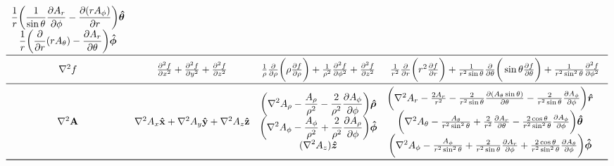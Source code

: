 \documentclass[a4paper]{scrarticle}
\begin{document}
\begin{sidewaystable}
\[\begin{array}{cccc}
\begin{matrix}
    \displaystyle \frac{1}{ r} \bigg (\frac{1 }{ \sin\theta}\pdv{A_r }{\phi}
    - \pdv{( r A_\phi )}{r}  \bigg ) \boldsymbol{\hat \theta}\\
    \displaystyle \frac{1 }{ r}\bigg (\frac{\partial }{ \partial r} ( r A_\theta )
    - \pdv{ A_r }{\theta} \bigg) \boldsymbol{\hat \phi}
\end{matrix}
\\
\midrule
\nabla^2 f &
    \frac{\partial^2 f }{ \partial x^2} + \frac{\partial^2 f }{ \partial y^2} + \frac{\partial^2 f }{ \partial z^2}&
    \frac{1 }{ \rho}\frac{\partial }{ \partial \rho} \bigg (\rho \frac{\partial f }{ \partial \rho} \bigg )
    + \frac{1 }{ \rho^2}\frac{\partial^2 f }{ \partial \phi^2}
    + \frac{\partial^2 f }{ \partial z^2}
    &
    \frac{1 }{ r^2}\frac{\partial }{ \partial r} \bigg (r^2 \frac{\partial f }{ \partial r} \bigg)
    + \frac{1 }{ r^2\sin\theta}\frac{\partial }{ \partial \theta} \bigg(\sin\theta \frac{\partial f }{ \partial \theta} \bigg)
    + \frac{1 }{ r^2\sin^2\theta}\frac{\partial^2 f }{ \partial \phi^2}\\
\midrule
\nabla^2 \mathbf{A} &
    \nabla^2 A_x \mathbf{\hat x} + \nabla^2 A_y \mathbf{\hat y} + \nabla^2 A_z \mathbf{\hat z} & 
\begin{matrix}
    \displaystyle \bigg (\nabla^2 A_\rho - \frac{A_\rho }{ \rho^2}
    - \frac{2 }{ \rho^2}\frac{\partial A_\phi }{ \partial \phi} \bigg) \boldsymbol{\hat\rho}\\
    \displaystyle \bigg (\nabla^2 A_\phi - \frac{A_\phi }{ \rho^2}
    + \frac{2 }{ \rho^2}\frac{\partial A_\rho }{ \partial \phi} \bigg ) \boldsymbol{\hat\phi}\\
    \displaystyle (\nabla^2 A_z ) \boldsymbol{\hat z}
\end{matrix} & 
\begin{matrix}
    \bigg (\nabla^2 A_r - \frac{2 A_r }{ r^2}
    - \frac{2 }{ r^2\sin\theta}\frac{\partial (A_\theta \sin\theta) }{ \partial\theta}
    - \frac{2 }{ r^2\sin\theta}\frac{\partial A_\phi }{ \partial \phi} \bigg ) \boldsymbol{\hat r}\\
    \bigg (\nabla^2 A_\theta - \frac{A_\theta }{ r^2\sin^2\theta}
    + \frac{2 }{ r^2}\frac{\partial A_r }{ \partial \theta}
    - \frac{2 \cos\theta }{ r^2\sin^2\theta}\frac{\partial A_\phi }{ \partial \phi} \bigg ) \boldsymbol{\hat\theta}\\
    \bigg (\nabla^2 A_\phi - \frac{A_\phi }{ r^2\sin^2\theta}
    + \frac{2 }{ r^2\sin\theta}\pdv{ A_r }{  \phi}
    + \frac{2 \cos\theta }{ r^2\sin^2\theta}\frac{\partial A_\theta }{ \partial \phi} \bigg ) \boldsymbol{\hat\phi} & 
\end{matrix}
\\ \bottomrule
\end{array}
\]
\end{sidewaystable}
\end{document}
